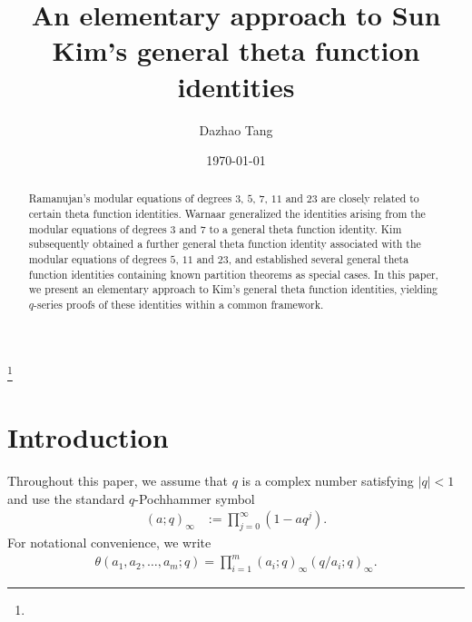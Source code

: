 \documentclass[12pt,reqno]{amsart}
\numberwithin{equation}{section}
\theoremstyle{plain}
\theoremstyle{definition}
\begin{document}
\title[An elementary approach to general theta function identities]
{An elementary approach to Sun Kim's general theta function identities}

\author[D. Tang]{Dazhao Tang}

\address[Dazhao Tang]{School of Mathematical Sciences, Chongqing Normal University,
Chongqing 401331, P.R. China}

\date{\today}

\begin{abstract}
Ramanujan's modular equations of degrees $3$, $5$, $7$, $11$ and $23$ are closely
related to certain theta function identities. Warnaar generalized the identities
arising from the modular equations of degrees $3$ and $7$ to a general theta function
identity. Kim subsequently obtained a further general theta function identity
associated with the modular equations of degrees $5$, $11$ and $23$, and established
several general theta function identities containing known partition theorems as
special cases. In this paper, we present an elementary approach to Kim's general
theta function identities, yielding  $q$-series proofs of these identities within a
common framework.
\end{abstract}



\thanks{}

\maketitle


\section{Introduction}

Throughout this paper, we assume that $q$ is a complex number satisfying $|q|<1$ and
use the standard $q$-Pochhammer symbol
\begin{align*}
(a;q)_\infty &:=\prod_{j=0}^\infty(1-aq^j).
\end{align*}
For notational convenience, we write
\begin{align*}
\theta(a_1,a_2,\ldots,a_m;q)=\prod_{i=1}^m(a_i;q)_\infty(q/a_i;q)_\infty.
\end{align*}
\end{document}
